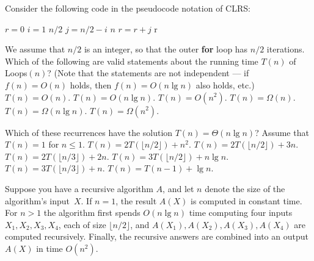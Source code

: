 Consider the following code in the pseudocode notation of CLRS:
\begin{codebox}
 \li $r = 0$
 \li \For $i = 1$ \To $n/2$
 \li \Do \For $j = n/2-i$ \To $n$
 \li \Do $r = r + j$ \End \End \End
 \li \Return r
\end{codebox}
We assume that $n/2$ is an integer, so that the outer {\bf for} loop has $n/2$ iterations.
Which of the following are valid statements about the running time $T(n)$ of {\sc Loops}$(n)$?
(Note that the statements are not independent --- if $f(n) = O(n)$ holds, then $f(n) = O(n \lg n)$ also holds, etc.)
\multipleanswers
\optionsstart
\answer $T(n) = O(n)$.
\answer $T(n) = O(n \lg n)$.
\answer $T(n) = O(n^2)$. \correct
\answer $T(n) = \Omega(n)$. \correct
\answer $T(n) = \Omega(n \lg n)$. \correct
\answer $T(n) = \Omega(n^2)$. \correct
\optionsend




Which of these recurrences have the solution
$T(n) = \Theta(n \lg n)$? Assume that $T(n)=1$ for $n\leq 1$.
\multipleanswers
\optionsstart
\answer $T(n) = 2 T(\lfloor n/2\rfloor ) + n^2$.
\answer $T(n) = 2 T(\lfloor n/2\rfloor ) + 3n$. \correct
\answer $T(n) = 2 T(\lfloor n/3\rfloor ) + 2n$.
\answer $T(n) = 3 T(\lfloor n/2\rfloor ) + n \lg n$.
\answer $T(n) = 3 T(\lfloor n/3\rfloor ) + n$. \correct
\answer $T(n) = T(n-1) + \lg n$. \correct %
\optionsend
{}



Suppose you have a recursive algorithm $A$, and let $n$ denote the size of the algorithm's input~$X$.
If $n=1$, the result $A(X)$ is computed in constant time.
For $n>1$ the algorithm first spends $O(n \lg n)$ time computing four inputs $X_1, X_2, X_3, X_4$, each of size $\lfloor n/2\rfloor$, and $A(X_1), A(X_2), A(X_3), A(X_4)$ are computed recursively.
Finally, the recursive answers are combined into an output $A(X)$ in time $O(n^2)$.

